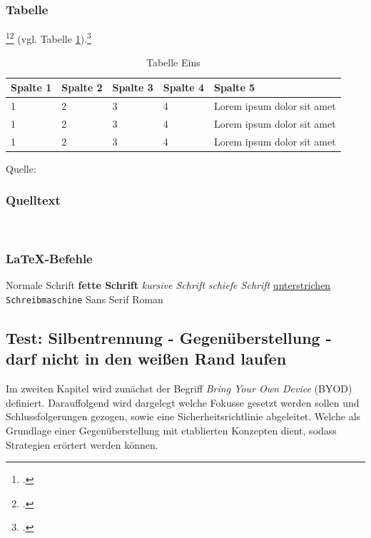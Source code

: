\subsubsection{Tabelle}
\Blindtext\footcite[Vgl. ][34]{Digitaloekonomie}\footcite[Vgl. ][]{mesh}
\blinditemize
\blindtext (vgl. Tabelle \ref{tabelle_eins}).\footcite[Vgl. ][511]{Tanenbaum2016}
\begin{table}[!htb]\label{tabelle_eins}
    \setlength{\arrayrulewidth}{1pt}
    \begin{threeparttable}
        \caption{Tabelle Eins}
        \begin{tabularx}{\textwidth}{|X|X|X|X|X|}
            \hline
            Spalte 1 & Spalte 2 & Spalte 3 & Spalte 4 & Spalte 5 \tabularnewline \hline
            1 & 2 & 3 & 4 & Lorem ipsum dolor sit amet \tabularnewline \hline
            1 & 2 & 3 & 4 & Lorem ipsum dolor sit amet \tabularnewline \hline
            1 & 2 & 3 & 4 & Lorem ipsum dolor sit amet \tabularnewline \hline
        \end{tabularx}
        \begin{tablenotes}[flushleft]
            \item \normalsize{Quelle: \cite[][207]{bsp}}
        \end{tablenotes}
    \end{threeparttable}
\end{table}

\subsubsection{Quelltext}

\captionsetup{width=1\textwidth}
\label{Red Hat} \\


\subsubsection{LaTeX-Befehle}
    \textnormal{Normale Schrift} 
    \textbullet\addspace \textbf{fette Schrift} 
    \textbullet\addspace \textit{kursive Schrift} 
    \textbullet\addspace \textsl{schiefe Schrift} 
    \textbullet\addspace \underline{unterstrichen} 
    \textbullet\addspace \texttt{Schreib\-ma\-schi\-ne} 
    \textbullet\addspace \textsf{Sans Serif} 
    \textbullet\addspace \textrm{Roman} 

\subsection{Test: Silbentrennung - Gegenüberstellung - darf nicht in den weißen Rand laufen}
Im zweiten Kapitel wird zunächst der Begriff \textit{Bring Your Own Device} (BYOD) definiert. Darauffolgend wird dargelegt welche Fokusse gesetzt werden sollen und Schlussfolgerungen gezogen, sowie eine Sicherheitsrichtlinie abgeleitet. Welche als Grundlage einer Gegenüberstellung mit etablierten Konzepten dient, sodass Strategien erörtert werden können. 

